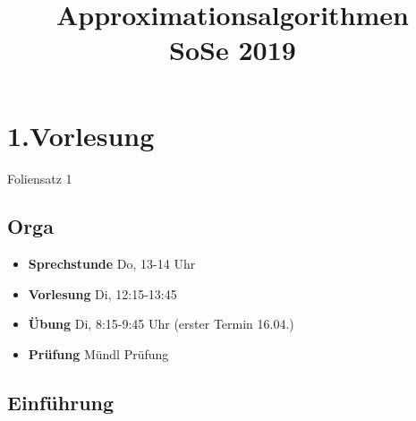 \documentclass[a4paper,11pt]{article}
\title{Approximationsalgorithmen \\SoSe 2019}
\begin{document}
\maketitle
\tableofcontents

\begin{abstract}

\end{abstract}

\section{1.Vorlesung}
Foliensatz 1
\subsection{Orga}
\begin{itemize}
  \item \textbf{Sprechstunde} Do, 13-14 Uhr
  \item \textbf{Vorlesung} Di, 12:15-13:45
  \item \textbf{Übung} Di, 8:15-9:45 Uhr (erster Termin 16.04.)
  \item \textbf{Prüfung} Mündl Prüfung
\end{itemize}

\subsection{Einführung}
\end{document}
